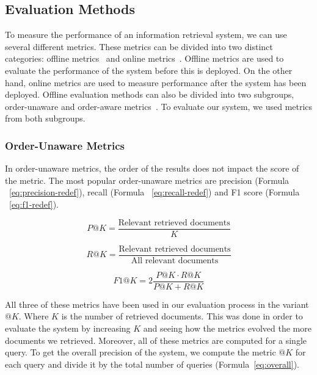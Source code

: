 \subsection{Evaluation Methods}\label{subsec:evaluation-methods}
To measure the performance of an information retrieval system, we can use several different metrics.
These metrics can be divided into two distinct categories: offline metrics~\cite{canamares_offline_2020} and online metrics~\cite{hofmann_online_2016}.
Offline metrics are used to evaluate the performance of the system before this is deployed.
On the other hand, online metrics are used to measure performance after the system has been deployed.
Offline evaluation methods can also be divided into two subgroups, order-unaware and order-aware metrics~\cite{canamares_offline_2020}.
To evaluate our system, we used metrics from both subgroups.

\subsubsection{Order-Unaware Metrics}
In order-unaware metrics, the order of the results does not impact the score of the metric.
The most popular order-unaware metrics are precision (Formula ~\ref{eq:precision-redef}), recall (Formula ~\ref{eq:recall-redef}) and F1 score (Formula ~\ref{eq:f1-redef}).

\begin{equation}
    P@K = \frac{\text{Relevant retrieved documents}}{K}
    \label{eq:precision-redef}
\end{equation}

\begin{equation}
    R@K = \frac{\text{Relevant retrieved documents}}{\text{All relevant documents}}
    \label{eq:recall-redef}
\end{equation}

\begin{equation}
    F1@K = 2 \frac{P@K \cdot R@K}{P@K + R@K}
    \label{eq:f1-redef}
\end{equation}

\noindent All three of these metrics have been used in our evaluation process in the variant $@K$.
Where $K$ is the number of retrieved documents.
This was done in order to evaluate the system by increasing $K$ and seeing how the metrics evolved the more documents we retrieved.
Moreover, all of these metrics are computed for a single query.
To get the overall precision of the system, we compute the metric $@K$ for each query and divide it by the total number of queries (Formula~\ref{eq:overall}).

